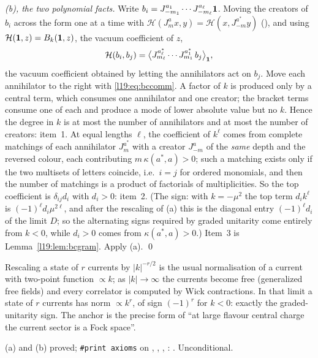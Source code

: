 \emph{(b), the two polynomial facts.} Write $b_i = J^{a_1}_{-m_1}\cdots J^{a_\ell}_{-m_\ell}\mathbf{1}$. Moving the creators of $b_i$ across the form one at a
time with $\mathcal H(J^a_mx,y) = \mathcal H(x,J^{a^*}_{-m}y)$ (), and using $\mathcal H(\mathbf{1},z) = B_k(\mathbf{1},z)$, the
vacuum coefficient of $z$,
\begin{equation}\label{l19:eq:bcwick}
  \mathcal H(b_i,b_j) = \bigl\langle J^{a_\ell^*}_{m_\ell}\cdots J^{a_1^*}_{m_1}\,b_j\bigr\rangle_{\mathbf{1}},
\end{equation}
the vacuum coefficient obtained by letting the annihilators act on $b_j$. Move each annihilator to the right with
\eqref{l19:eq:bccomm}. A factor of $k$ is produced only by a central term, which consumes one annihilator and one
creator; the bracket terms consume one of each and produce a mode of lower absolute value but no $k$. Hence the
degree in $k$ is at most the number of annihilators and at most the number of creators: item~1. At equal lengths
$\ell$, the coefficient of $k^\ell$ comes from complete matchings of each annihilator $J^{a^*}_m$ with a creator
$J^{a}_{-m}$ of the \emph{same} depth and the reversed colour, each contributing $m\,\kappa(a^*,a)>0$; such a
matching exists only if the two multisets of letters coincide, i.e.\ $i = j$ for ordered monomials, and then the
number of matchings is a product of factorials of multiplicities. So the top coefficient is $\delta_{ij}d_i$ with
$d_i>0$: item~2. (The sign: with $k = -\mu^2$ the top term $d_ik^{\ell}$ is $(-1)^{\ell}d_i\mu^{2\ell}$, and after the rescaling
of (a) this is the diagonal entry $(-1)^{\ell}d_i$ of the limit $D$; so the alternating signs required by graded unitarity
come entirely from $k<0$, while $d_i>0$ comes from $\kappa(a^*,a)>0$.) Item~3 is Lemma~\ref{l19:lem:bcgram}. Apply (a). \qed

\begin{physics}
Rescaling a state of $r$ currents by $|k|^{-r/2}$ is the usual normalisation of a current with two-point function
$\propto k$; as $|k|\to\infty$ the currents become free (generalized free fields) and every correlator is computed by
Wick contractions. In that limit a state of $r$ currents has norm $\propto k^r$, of sign $(-1)^r$ for $k<0$: exactly the
graded-unitarity sign. The anchor is the precise form of ``at large flavour central charge the current sector is a Fock
space''.
\end{physics}

\begin{status}
(a) and (b) proved; \texttt{\#print axioms} on , ,
, : .
Unconditional.
\end{status}

